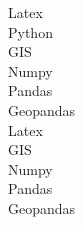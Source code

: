 \fstars \medspace Latex\\
\mstars \medspace Python\\
\lstars \medspace GIS\\
\fstars \medspace Numpy\\
\mstars \medspace Pandas\\
\lstars \medspace Geopandas\\
\fstars \medspace Latex\\
\lstars \medspace GIS\\
\fstars \medspace Numpy\\
\mstars \medspace Pandas\\
\lstars \medspace Geopandas\\
